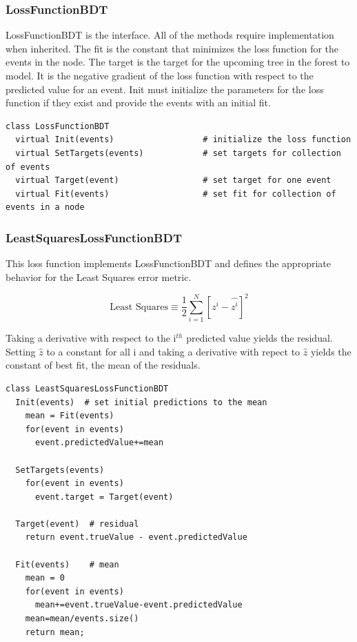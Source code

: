 \documentclass[12pt]{article}
\begin{document}
\subsubsection{LossFunctionBDT}

LossFunctionBDT is the interface. All of the methods require implementation when inherited. The fit is the constant that minimizes the loss function for the events in the node. The target is the target for the upcoming tree in the forest to model. It is the negative gradient of the loss function with respect to the predicted value for an event. Init must initialize the parameters for the loss function if they exist and provide the events with an initial fit.  

\begin{verbatim}
class LossFunctionBDT
  virtual Init(events)                  # initialize the loss function
  virtual SetTargets(events)            # set targets for collection of events
  virtual Target(event)                 # set target for one event
  virtual Fit(events)                   # set fit for collection of events in a node
\end{verbatim}

\subsubsection{LeastSquaresLossFunctionBDT}

This loss function implements LossFunctionBDT and defines the appropriate behavior for the Least Squares error metric.

\begin{equation}
\textrm{Least Squares} \equiv \frac{1}{2}\sum_{i=1}^{N} [z^i-\hat{z^i}]^2
\end{equation}

Taking a derivative with respect to the i$^{th}$ predicted value yields the residual. Setting $\hat{z}$ to a constant for all i and taking a derivative with repect to $\hat{z}$ yields the constant of best fit, the mean of the residuals.    

\begin{verbatim}
class LeastSquaresLossFunctionBDT
  Init(events)  # set initial predictions to the mean
    mean = Fit(events)
    for(event in events)
      event.predictedValue+=mean

  SetTargets(events)  
    for(event in events)  
      event.target = Target(event)

  Target(event)  # residual                 
    return event.trueValue - event.predictedValue

  Fit(events)    # mean                 
    mean = 0
    for(event in events)
      mean+=event.trueValue-event.predictedValue
    mean=mean/events.size()
    return mean;

\end{verbatim}
\end{document}
